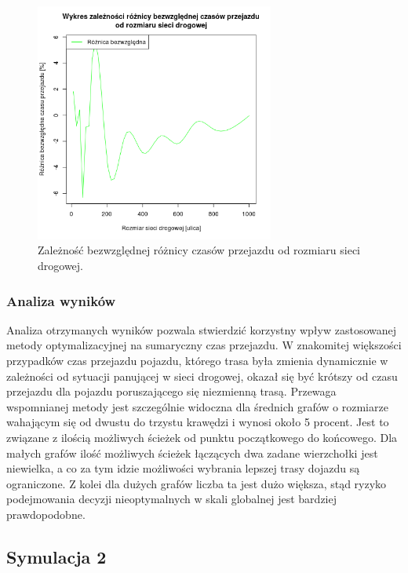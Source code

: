 \documentclass[11pt,a4paper]{article}
\begin{document}
\begin{figure}[H]
	\centering
		\includegraphics[width=0.7\textwidth]{../images/simulation1_diff}
	\caption{Zależność bezwzględnej różnicy czasów przejazdu od rozmiaru sieci drogowej.}
\end{figure}

\subsubsection{Analiza wyników}

Analiza otrzymanych wyników pozwala stwierdzić korzystny wpływ zastosowanej metody optymalizacyjnej na sumaryczny czas przejazdu. W znakomitej większości przypadków czas przejazdu pojazdu, którego trasa była zmienia dynamicznie w zależności od sytuacji panującej w sieci drogowej, okazał się być krótszy od czasu przejazdu dla pojazdu poruszającego się niezmienną trasą. Przewaga wspomnianej metody jest szczególnie widoczna dla średnich grafów o rozmiarze wahającym się od dwustu do trzystu krawędzi i wynosi około 5 procent. Jest to związane z ilością możliwych ścieżek od punktu początkowego do końcowego. Dla małych grafów ilość możliwych ścieżek łączących dwa zadane wierzchołki jest niewielka, a co za tym idzie możliwości wybrania lepszej trasy dojazdu są ograniczone. Z kolei dla dużych grafów liczba ta jest dużo większa, stąd ryzyko podejmowania decyzji nieoptymalnych w skali globalnej jest bardziej prawdopodobne. 

\subsection{Symulacja 2}
\end{document}
